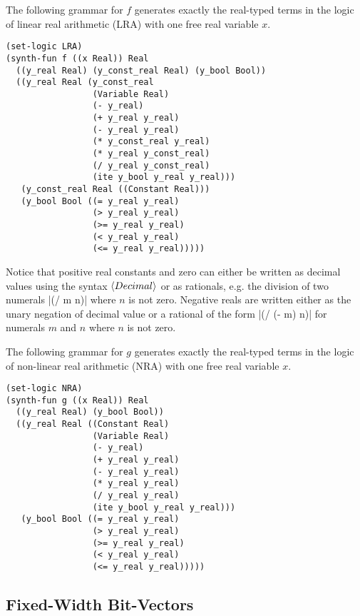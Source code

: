\documentclass[english,a4paper,10pt]{article}
\begin{document}
\begin{appendix}
The following grammar for $f$
generates exactly the real-typed terms in the logic of
linear real arithmetic (LRA)
with one free real variable $x$.
\begin{lstlisting}[language=SyGuS]
(set-logic LRA)
(synth-fun f ((x Real)) Real
  ((y_real Real) (y_const_real Real) (y_bool Bool))
  ((y_real Real (y_const_real 
                 (Variable Real) 
                 (- y_real)
                 (+ y_real y_real)
                 (- y_real y_real)
                 (* y_const_real y_real)
                 (* y_real y_const_real)
                 (/ y_real y_const_real)
                 (ite y_bool y_real y_real)))
   (y_const_real Real ((Constant Real)))
   (y_bool Bool ((= y_real y_real)
                 (> y_real y_real)
                 (>= y_real y_real)
                 (< y_real y_real)
                 (<= y_real y_real)))))
\end{lstlisting}
Notice that positive real constants and zero can either be written 
as decimal values using the syntax $\left\langle Decimal\right\rangle$
or as rationals, e.g. the division of two numerals
\code|(/ m n)| where $n$ is not zero.
Negative reals are written either as the unary negation of decimal value 
or a rational of the form \code|(/ (- m) n)| for numerals $m$ and $n$
where $n$ is not zero.

The following grammar for $g$
generates exactly the real-typed terms in the logic of
non-linear real arithmetic (NRA)
with one free real variable $x$.
\begin{lstlisting}[language=SyGuS]
(set-logic NRA)
(synth-fun g ((x Real)) Real
  ((y_real Real) (y_bool Bool))
  ((y_real Real ((Constant Real) 
                 (Variable Real)
                 (- y_real)
                 (+ y_real y_real)
                 (- y_real y_real)
                 (* y_real y_real)
                 (/ y_real y_real)
                 (ite y_bool y_real y_real)))
   (y_bool Bool ((= y_real y_real)
                 (> y_real y_real)
                 (>= y_real y_real)
                 (< y_real y_real)
                 (<= y_real y_real)))))
\end{lstlisting}

\subsection{Fixed-Width Bit-Vectors}


\end{appendix}
\end{document}

